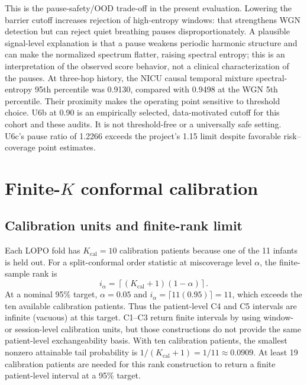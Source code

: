 This is the pause-safety/OOD trade-off in the present evaluation. Lowering the barrier cutoff increases rejection of high-entropy windows: that strengthens WGN detection but can reject quiet breathing pauses disproportionately. A plausible signal-level explanation is that a pause weakens periodic harmonic structure and can make the normalized spectrum flatter, raising spectral entropy; this is an interpretation of the observed score behavior, not a clinical characterization of the pauses. At three-hop history, the NICU causal temporal mixture spectral-entropy 95th percentile was 0.9130, compared with 0.9498 at the WGN 5th percentile. Their proximity makes the operating point sensitive to threshold choice. U6b at 0.90 is an empirically selected, data-motivated cutoff for this cohort and these audits. It is not threshold-free or a universally safe setting. U6c's pause ratio of 1.2266 exceeds the project's 1.15 limit despite favorable risk--coverage point estimates.

\section{Finite-\texorpdfstring{$K$}{K} conformal calibration}
\label{sec:ch5_conformal}

\subsection{Calibration units and finite-rank limit}

Each LOPO fold has $K_{\mathrm{cal}}=10$ calibration patients because one of the 11 infants is held out. For a split-conformal order statistic at miscoverage level $\alpha$, the finite-sample rank is
\[
i_{\alpha}=\left\lceil (K_{\mathrm{cal}}+1)(1-\alpha)\right\rceil.
\]
At a nominal 95\% target, $\alpha=0.05$ and $i_{\alpha}=\lceil 11(0.95)\rceil=11$, which exceeds the ten available calibration patients. Thus the patient-level C4 and C5 intervals are infinite (vacuous) at this target. C1--C3 return finite intervals by using window- or session-level calibration units, but those constructions do not provide the same patient-level exchangeability basis. With ten calibration patients, the smallest nonzero attainable tail probability is $1/(K_{\mathrm{cal}}+1)=1/11\approx0.0909$. At least 19 calibration patients are needed for this rank construction to return a finite patient-level interval at a 95\% target.

